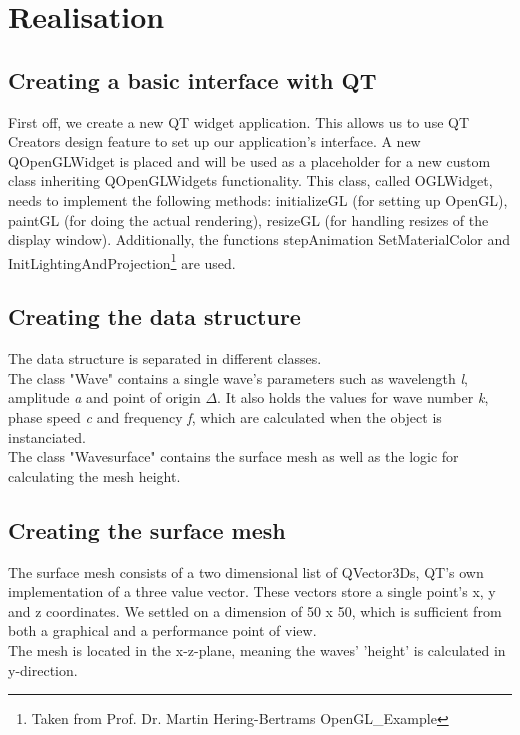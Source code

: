 \documentclass[12pt,a4paper]{scrartcl}
\begin{document}
\section{Realisation}

\subsection{Creating a basic interface with QT}
First off, we create a new QT widget application. This allows us to use QT Creators design feature to set up our application's interface. A new QOpenGLWidget is placed and will be used as a placeholder for a new custom class inheriting QOpenGLWidgets functionality. This class, called OGLWidget, needs to implement the following methods: initializeGL (for setting up OpenGL), paintGL (for doing the actual rendering), resizeGL (for handling resizes of the display window). Additionally, the functions stepAnimation SetMaterialColor and InitLightingAndProjection\footnote{Taken from Prof. Dr. Martin Hering-Bertrams OpenGL_Example} are used.

\subsection{Creating the data structure}
The data structure is separated in different classes. \\
The class "Wave" contains a single wave's parameters such as wavelength \textit{l}, amplitude \textit{a} and point of origin $\Delta$. It also holds the values for wave number \textit{k}, phase speed \textit{c} and frequency \textit{f}, which are calculated when the object is instanciated. \\ 
The class "Wavesurface" contains the surface mesh as well as the logic for calculating the mesh height.

\subsection{Creating the surface mesh}
The surface mesh consists of a two dimensional list of QVector3Ds, QT's own implementation of a three value vector. These vectors store a single point's x, y and z coordinates. We settled on a dimension of 50 x 50, which is sufficient from both a graphical and a performance point of view.\\
The mesh is located in the x-z-plane, meaning the waves' 'height' is calculated in y-direction.\\
\end{document}

